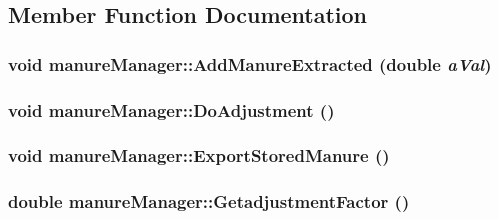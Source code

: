 \subsection{Member Function Documentation}
\hypertarget{classmanure_manager_a175d2fe4c3718bd804ef5e7d69bdbcf2}{
\subsubsection[{AddManureExtracted}]{\setlength{\rightskip}{0pt plus 5cm}void manureManager::AddManureExtracted (double {\em aVal})}}
\label{classmanure_manager_a175d2fe4c3718bd804ef5e7d69bdbcf2}
\hypertarget{classmanure_manager_aa04807903f10029a7b7f160bacd77336}{
\subsubsection[{DoAdjustment}]{\setlength{\rightskip}{0pt plus 5cm}void manureManager::DoAdjustment ()}}
\label{classmanure_manager_aa04807903f10029a7b7f160bacd77336}
\hypertarget{classmanure_manager_a3d20907c84608bca89b497db1e24be4f}{
\subsubsection[{ExportStoredManure}]{\setlength{\rightskip}{0pt plus 5cm}void manureManager::ExportStoredManure ()}}
\label{classmanure_manager_a3d20907c84608bca89b497db1e24be4f}
\hypertarget{classmanure_manager_a2237d1ee769ea8d80f06c486ae89e811}{
\subsubsection[{GetadjustmentFactor}]{\setlength{\rightskip}{0pt plus 5cm}double manureManager::GetadjustmentFactor ()}}
\label{classmanure_manager_a2237d1ee769ea8d80f06c486ae89e811}
